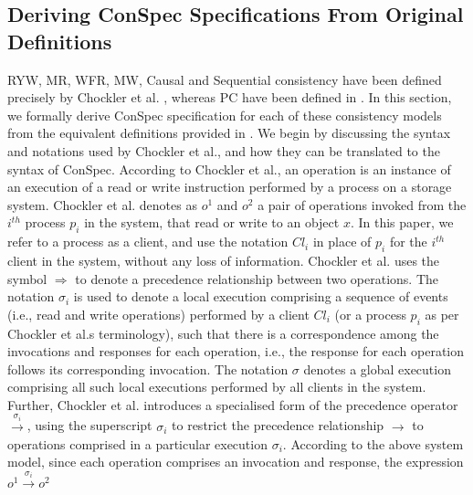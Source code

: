 \documentclass[acmlarge, ,11pt]{acmart}
\begin{document}
\subsection{Deriving ConSpec Specifications From Original Definitions}\label{sec:derive}
 RYW, MR, WFR, MW, Causal and Sequential consistency have been defined precisely by Chockler et al. \cite{Chockler2000}, whereas PC have been defined in \cite{Ahamad:1993:PPC:165231.165264, Owens:2009:BXM:1616077.1616107}.  In this section, %
  we formally derive ConSpec specification for each of these consistency models from the equivalent definitions provided in \cite{Chockler2000, Ahamad:1993:PPC:165231.165264, Owens:2009:BXM:1616077.1616107}. We begin by discussing the  syntax  and notations used by Chockler et al., and how they can be translated to %
  the syntax of ConSpec.  According to Chockler et al., an operation is an  instance of an execution of a read or write instruction performed by a process  on a storage system. Chockler et al. denotes  as $\mathit{o}^1$ and
 $\mathit{o}^2$ a pair of  operations invoked from %
 the $i^{th}$  process $ p_i$ in the system, that  read or write to an object $x$. %
 In this paper, we refer to a process as a client, and use the notation $\mathit{Cl}_i$ in place of $p_i$ for the $i^{th}$ client in the system, %
 without any loss of information. Chockler et al. uses the symbol $\Rightarrow$ to denote a
  precedence relationship \cite{Bailis:2013:BCC:2463676.2465279} between two operations. The
  notation $\sigma_i$ is used to denote a local execution comprising a sequence of events (i.e., read and write operations) performed by  a client $\mathit{Cl}_i$ (or a process $p_i$ as per Chockler et al.\textquotesingle s terminology), such that there is a correspondence among the invocations and responses for each operation, i.e., the response for each operation follows its corresponding invocation. The notation $\sigma$ denotes a global execution comprising all such local executions performed by all clients in the system. Further,  Chockler et al. introduces a specialised form of the precedence operator $\xrightarrow{\sigma_i}$, using the superscript $\sigma_i$ to restrict the precedence relationship $\rightarrow$ to operations comprised in a  particular execution  $\sigma_i$.  According to the above system model, since each operation comprises an invocation and response, the expression $\mathit{o}^1 \xrightarrow{\sigma_i} \mathit{o}^2$
\end{document}
